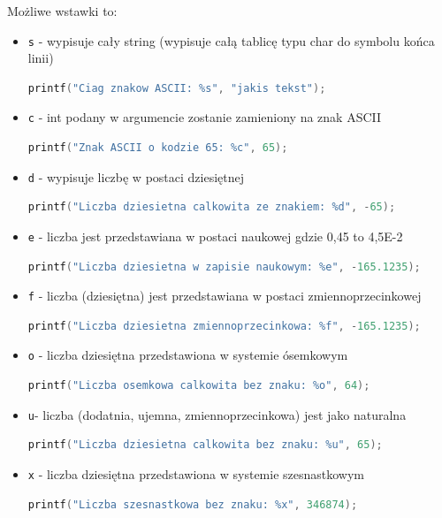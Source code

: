 \documentclass[a4paper,12pt,oneside]{book}
\begin{document}
					Możliwe wstawki to:
					\begin{itemize}
						\item \verb*|s| - wypisuje cały string (wypisuje całą tablicę typu char do symbolu końca linii)
						\begin{lstlisting}[language=C]
printf("Ciag znakow ASCII: %s", "jakis tekst"); 
						\end{lstlisting}
						\item \verb*|c| - int podany w argumencie zostanie zamieniony na znak ASCII
						\begin{lstlisting}[language=C]
printf("Znak ASCII o kodzie 65: %c", 65);
						\end{lstlisting}
						\item \verb*|d| - wypisuje liczbę w postaci dziesiętnej
						\begin{lstlisting}[language=C]
printf("Liczba dziesietna calkowita ze znakiem: %d", -65); 
						\end{lstlisting}
						\item \verb*|e| - liczba jest przedstawiana w postaci naukowej gdzie 0,45 to 4,5E-2
						\begin{lstlisting}[language=C]
printf("Liczba dziesietna w zapisie naukowym: %e", -165.1235); 
						\end{lstlisting}
						\item \verb*|f| - liczba (dziesiętna) jest przedstawiana w postaci zmiennoprzecinkowej
						\begin{lstlisting}[language=C]
printf("Liczba dziesietna zmiennoprzecinkowa: %f", -165.1235);
						\end{lstlisting}
						\item \verb*|o| -  liczba dziesiętna przedstawiona w systemie ósemkowym
						\begin{lstlisting}[language=C]
printf("Liczba osemkowa calkowita bez znaku: %o", 64); 
						\end{lstlisting}
						\item \verb*|u|- liczba (dodatnia, ujemna, zmiennoprzecinkowa) jest jako naturalna
						\begin{lstlisting}[language=C]
printf("Liczba dziesietna calkowita bez znaku: %u", 65);
						\end{lstlisting}
						\item \verb*|x| - liczba dziesiętna przedstawiona w systemie szesnastkowym
						\begin{lstlisting}[language=C]
printf("Liczba szesnastkowa bez znaku: %x", 346874); 
						\end{lstlisting}
					\end{itemize}
					
\end{document}
